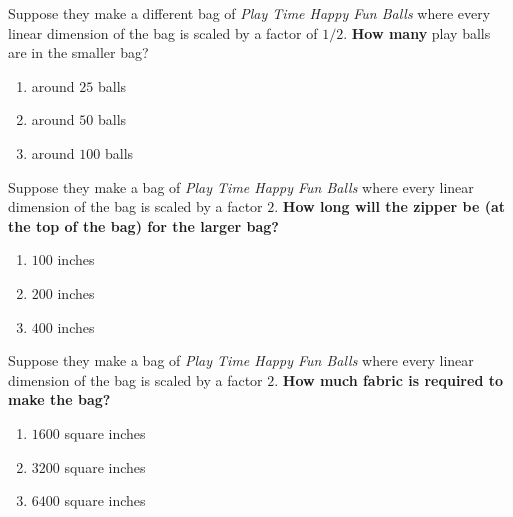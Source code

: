 \documentclass[handout,noauthor,nooutcomes,12pt]{ximera}
\begin{document}
\begin{exercise}
   Suppose they make a different bag of \textit{Play Time Happy Fun
    Balls} where every linear dimension of the bag is scaled by a
  factor of $1/2$.  \textbf{How many} play balls are in the smaller bag?
  \begin{multicols}{3}
    \begin{enumerate}
  \item around $25$ balls
  \item around $50$ balls
  \item around $100$ balls
    \end{enumerate}
  \end{multicols}
\end{exercise}



\begin{exercise}
 Suppose they make a bag of \textit{Play Time Happy Fun Balls} where
 every linear dimension of the bag is scaled by a factor $2$.
 \textbf{How long will the zipper be (at the top of the bag) for the larger bag?}
 \begin{multicols}{3}
   \begin{enumerate}
  \item $100$ inches
  \item $200$ inches
  \item $400$ inches
   \end{enumerate}
 \end{multicols}
\end{exercise}



\begin{exercise}
  Suppose they make a bag of \textit{Play Time Happy Fun Balls} where
  every linear dimension of the bag is scaled by a factor $2$.
  \textbf{How much fabric is required to make the bag?}
  \begin{multicols}{3}
    \begin{enumerate}
    \item $1600$ square inches
    \item $3200$ square inches
    \item $6400$ square inches
    \end{enumerate}
  \end{multicols}
\end{exercise}




\end{document}
